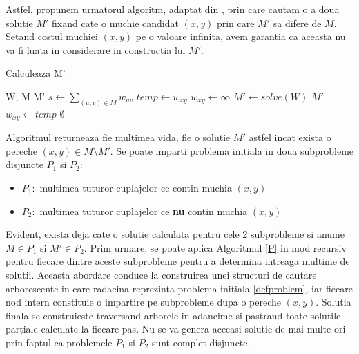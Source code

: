 Astfel, propunem urmatorul algoritm, adaptat din \cite{allmatchings}, prin care cautam o a doua
solutie $M'$ fixand cate o muchie candidat $(x, y)$ prin care $M'$ sa difere de $M$. Setand costul
muchiei $(x, y)$ pe o valoare infinita, avem garantia ca aceasta nu va fi luata in considerare in 
constructia lui $M'$.
\begin{algorithm}
\label{P}
\caption{Calculeaza M'}
\begin{algorithmic}
\REQUIRE W, M
\ENSURE M'
  \STATE $s \gets \sum_{(u, v) \in M} w_{uv}$
    \STATE $temp \gets w_{xy}$
    \STATE $w_{xy} \gets \infty$
    \STATE $M' \gets solve(W)$
    \RETURN $M'$
    \ELSE
    \STATE $w_{xy} \gets temp$
    \ENDIF
  \ENDFOR
  \RETURN $\emptyset$
\end{algorithmic}
\end{algorithm}

Algoritmul returneaza fie multimea vida, fie o solutie $M'$ astfel incat exista o pereche $(x, y)
\in M \setminus M'$. Se poate imparti problema initiala in doua subprobleme disjuncte $P_1$ si
$P_2$:
\begin{itemize}
  \item $P_1\colon$ multimea tuturor cuplajelor ce contin muchia $(x, y)$
  \item $P_2\colon$ multimea tuturor cuplajelor ce \textbf{nu} contin muchia $(x, y)$
\end{itemize}

Evident, exista deja cate o solutie calculata pentru cele 2 subprobleme si anume $M \in P_1$ si 
$M' \in P_2$. Prim urmare, se poate aplica Algoritmul \ref{P} in mod recursiv pentru fiecare dintre 
aceste subprobleme pentru a determina intreaga multime de solutii. Aceasta abordare conduce la
construirea unei structuri de cautare arborescente in care radacina reprezinta problema initiala
\ref{defproblem}, iar fiecare nod intern constituie o impartire pe subprobleme dupa o pereche 
$(x, y)$. Solutia finala se construieste traversand arborele in adancime si pastrand toate solutile
parțiale calculate la fiecare pas. Nu se va genera aceeasi solutie de mai multe ori prin faptul ca
problemele $P_1$ si $P_2$ sunt complet disjuncte.

